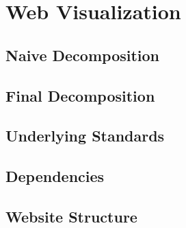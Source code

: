 \chapter{Web Visualization}

\section{Naive Decomposition}

\section{Final Decomposition}

\section{Underlying Standards}

\section{Dependencies}

\section{Website Structure}
